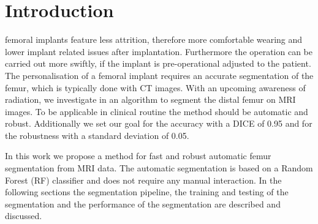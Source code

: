 \section{Introduction}
 femoral implants feature less attrition, therefore more comfortable wearing and lower implant related issues after implantation. Furthermore the operation can be carried out more swiftly, if the implant is pre-operational adjusted to the patient. The personalisation of a femoral implant requires an accurate segmentation of the femur, which is typically done with CT images. With an upcoming awareness of radiation, we investigate in an algorithm to segment the distal femur on MRI images. To be applicable in clinical routine the method should be automatic and robust. Additionally we set our goal for the accuracy with a DICE of 0.95 and for the robustness with a standard deviation of 0.05.

In this work we propose a method for fast and robust automatic femur segmentation from MRI data. The automatic segmentation is based on a Random Forest (RF) classifier \cite{rf} and does not require any manual interaction. In the following sections the segmentation pipeline, the training and testing of the segmentation and the performance of the segmentation are described and discussed.